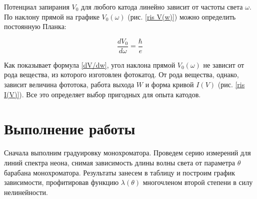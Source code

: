 \documentclass[12pt]{kiarticle}
\begin{document}
	Потенциал запирания $ V_0 $ для любого катода линейно зависит от
	частоты света $ \omega $. По наклону прямой на графике $ V_0(\omega) $ (рис. \ref{ris V(w)}) можно определить постоянную Планка:
	
	\begin{equation}\label{dV/dw}
	\dfrac{dV_0}{d\omega} = \dfrac{\hbar}{e}
	\end{equation}
	
	Как показывает формула \eqref{dV/dw}, угол наклона прямой $ V_0(\omega) $ не зависит от рода вещества, из которого изготовлен фотокатод. От рода вещества, однако, зависит величина фототока, работа выхода $ W $ и форма кривой $ I(V) $ (рис. \ref{ris I(V)}). Все это определяет выбор пригодных для
	опыта катодов.


	
	
	\section{Выполнение работы}
	
	Сначала выполним градуировку монохроматора. Проведем серию измерений для линий спектра неона, снимая зависимость длины волны света от параметра $ \theta $ барабана монохроматора. Результаты занесем в таблицу и построим график зависимости, профитировав функцию $ \lambda (\theta) $ многочленом второй степени в силу нелинейности. 
	
\end{document}

